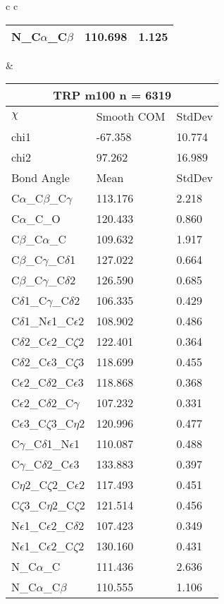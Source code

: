 \begin{longtable}{ c c }
\begin{tabular}{ l l l }
  N\_C$\alpha$\_C$\beta$ & 110.698 & 1.125\\
  \bottomrule
  \end{tabular}
  &
  \begin{tabular}{ l l l }
  \toprule
  \multicolumn{3}{c}{TRP \textbf{m100} n = 6319} \\ \toprule
  $\chi$       & Smooth COM & StdDev \\ \midrule
  chi1 & -67.358 & 10.774 \\ 
  chi2 & 97.262 & 16.989 \\ \midrule
  Bond Angle   & Mean     & StdDev \\ \midrule
  C$\alpha$\_C$\beta$\_C$\gamma$ & 113.176 & 2.218\\
  C$\alpha$\_C\_O & 120.433 & 0.860\\
  C$\beta$\_C$\alpha$\_C & 109.632 & 1.917\\
  C$\beta$\_C$\gamma$\_C$\delta$1 & 127.022 & 0.664\\
  C$\beta$\_C$\gamma$\_C$\delta$2 & 126.590 & 0.685\\
  C$\delta$1\_C$\gamma$\_C$\delta$2 & 106.335 & 0.429\\
  C$\delta$1\_N$\epsilon$1\_C$\epsilon$2 & 108.902 & 0.486\\
  C$\delta$2\_C$\epsilon$2\_C$\zeta$2 & 122.401 & 0.364\\
  C$\delta$2\_C$\epsilon$3\_C$\zeta$3 & 118.699 & 0.455\\
  C$\epsilon$2\_C$\delta$2\_C$\epsilon$3 & 118.868 & 0.368\\
  C$\epsilon$2\_C$\delta$2\_C$\gamma$ & 107.232 & 0.331\\
  C$\epsilon$3\_C$\zeta$3\_C$\eta$2 & 120.996 & 0.477\\
  C$\gamma$\_C$\delta$1\_N$\epsilon$1 & 110.087 & 0.488\\
  C$\gamma$\_C$\delta$2\_C$\epsilon$3 & 133.883 & 0.397\\
  C$\eta$2\_C$\zeta$2\_C$\epsilon$2 & 117.493 & 0.451\\
  C$\zeta$3\_C$\eta$2\_C$\zeta$2 & 121.514 & 0.456\\
  N$\epsilon$1\_C$\epsilon$2\_C$\delta$2 & 107.423 & 0.349\\
  N$\epsilon$1\_C$\epsilon$2\_C$\zeta$2 & 130.160 & 0.431\\
  N\_C$\alpha$\_C & 111.436 & 2.636\\
  N\_C$\alpha$\_C$\beta$ & 110.555 & 1.106\\
  \bottomrule
  \end{tabular}

\end{longtable}
